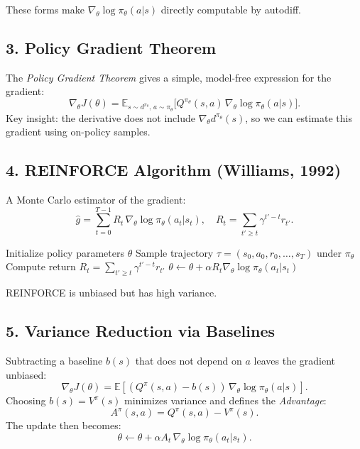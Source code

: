 These forms make $\nabla_\theta \log \pi_\theta(a|s)$ directly computable by autodiff.

\subsection*{3. Policy Gradient Theorem}

The \emph{Policy Gradient Theorem} gives a simple, model-free expression for the gradient:
\[
		\nabla_\theta J(\theta)
		= \mathbb{E}_{s \sim d^{\pi_\theta},\, a \sim \pi_\theta}
		\!\big[ Q^{\pi_\theta}(s,a)\,\nabla_\theta \log \pi_\theta(a|s) \big].
\]
Key insight: the derivative does not include $\nabla_\theta d^{\pi_\theta}(s)$,
so we can estimate this gradient using on-policy samples.

\subsection*{4. REINFORCE Algorithm (Williams, 1992)}

A Monte Carlo estimator of the gradient:
\[
		\hat{g} = \sum_{t=0}^{T-1} R_t \, \nabla_\theta \log \pi_\theta(a_t|s_t),
		\quad
		R_t = \sum_{t' \ge t} \gamma^{t'-t} r_{t'}.
\]
\begin{algorithm}[H]
		\caption{REINFORCE}
		\begin{algorithmic}
				\State Initialize policy parameters $\theta$
				\State Sample trajectory $\tau = (s_0,a_0,r_0,\ldots,s_T)$ under $\pi_\theta$
    \State Compute return $R_t = \sum_{t' \ge t} \gamma^{t'-t} r_{t'}$
    \State $\theta \leftarrow \theta + \alpha R_t \nabla_\theta \log \pi_\theta(a_t|s_t)$
				\EndFor
				\EndFor
		\end{algorithmic}
\end{algorithm}

REINFORCE is unbiased but has high variance.

\subsection*{5. Variance Reduction via Baselines}

Subtracting a baseline $b(s)$ that does not depend on $a$ leaves the gradient unbiased:
\[
		\nabla_\theta J(\theta)
		= \mathbb{E}\!\left[ (Q^\pi(s,a) - b(s)) \, \nabla_\theta \log \pi_\theta(a|s) \right].
\]
Choosing $b(s) = V^\pi(s)$ minimizes variance and defines the \emph{Advantage}:
\[
		A^\pi(s,a) = Q^\pi(s,a) - V^\pi(s).
\]
The update then becomes:
\[
		\theta \leftarrow \theta + \alpha A_t \, \nabla_\theta \log \pi_\theta(a_t|s_t).
\]


